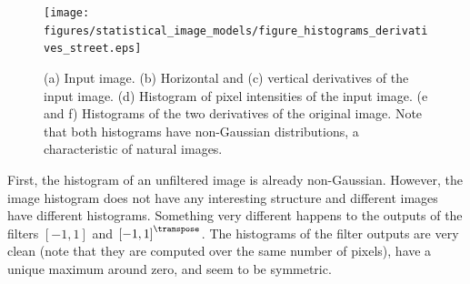 \begin{figure}[t]
\centerline{
\texttt{[image: figures/statistical\_image\_models/figure\_histograms\_derivatives\_street.eps]}
} 
\caption{(a) Input image.  (b) Horizontal and (c) vertical derivatives of the input image.  (d) Histogram of pixel intensities of the input image.  (e and f) Histograms of the two derivatives of the original image. Note that both histograms have non-Gaussian distributions, a characteristic of natural images.} 
\label{fig:derivativeshist}
\end{figure}



First, the histogram of an unfiltered image is already non-Gaussian. However, the image histogram does not have any interesting structure and different images have different histograms. Something very different happens to the outputs of the filters  $\left[-1,1\right]$ and $\left[-1,1\right]^\transpose$. The histograms of the filter outputs are very clean (note that they are computed over the same number of pixels), have a unique maximum around zero, and seem to be symmetric.


